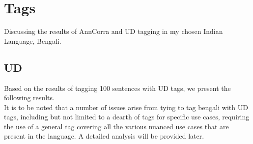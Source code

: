 \documentclass[a4 paper]{article}
\begin{document}

\section{Tags}

Discussing the results of AnnCorra and UD tagging in my chosen Indian Language,
Bengali.

\subsection{UD}

Based on the results of tagging 100 sentences with UD tags, we present the
following results.\\
It is to be noted that a number of issues arise from tying to tag bengali with
UD tags, including but not limited to a dearth of tags for specific use cases,
requiring the use of a general tag covering all the various nuanced use cases
that are present in the language. A detailed analysis will be provided later.
\end{document}
